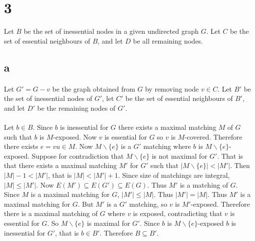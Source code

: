 \documentclass[letterpaper,12pt,oneside,onecolumn]{report}
\begin{document}
\section*{3}
Let $B$ be the set of inessential nodes in a given undirected graph $G$. Let $C$ be the set of essential neighbours of $B$, and let $D$ be all remaining nodes.
\subsection*{a}
\paragraph{}
Let $G' = G-v$ be the graph obtained from $G$ by removing node $v \in C$. Let $B'$ be the set of inessential nodes of $G'$, let $C'$ be the set of essential neighbours of $B'$, and let $D'$ be the remaining nodes of $G'$.
\paragraph{}
Let $b \in B$. Since $b$ is inessential for $G$ there exists a maximal matching $M$ of $G$ such that $b$ is $M$-exposed. Now $v$ is essential for $G$ so $v$ is $M$-covered. Therefore there exists $e=vu \in M$. Now $M\backslash\{e\}$ is a $G'$ matching where $b$ is $M\backslash\{e\}$-exposed. Suppose for contradiction that $M\backslash\{e\}$ is not maximal for $G'$. That is that there exists a maximal matching $M'$ for $G'$ such that $|M\backslash\{e\}| < |M'|$. Then $|M| - 1 < |M'|$, that is $|M| < |M'| + 1$. Since size of matchings are integral, $|M| \leq |M'|$. Now $E(M') \subseteq E(G') \subseteq E(G)$. Thus $M'$ is a matching of $G$. Since $M$ is a maximal matching for $G$, $|M'| \leq |M|$. Thus $|M'| = |M|$. Thus $M'$ is a maximal matching for $G$. But $M'$ is a $G'$ matching, so $v$ is $M'$-exposed. Therefore there is a maximal matching of $G$ where $v$ is exposed, contradicting that $v$ is essential for $G$. So $M\backslash\{e\}$ is maximal for $G'$. Since $b$ is $M\backslash\{e\}$-exposed $b$ is inessential for $G'$, that is $b \in B'$. Therefore $B \subseteq B'$. 
\end{document}
